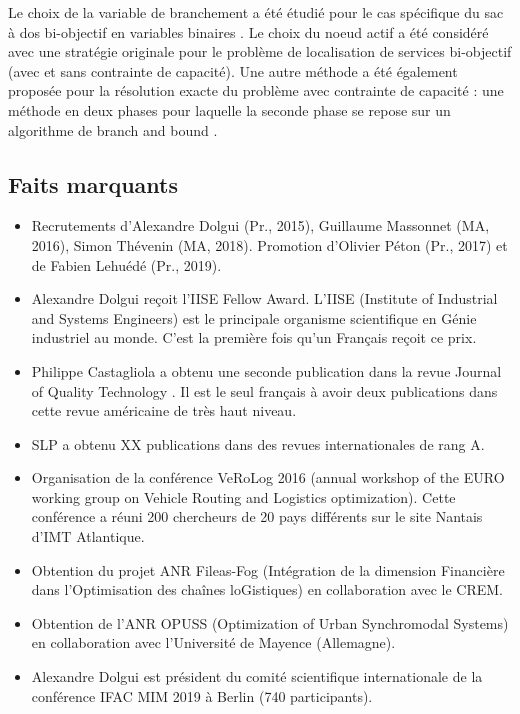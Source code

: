 \begin{enumerate}
Le choix de la variable de branchement a été étudié pour le cas spécifique du sac à dos bi-objectif en variables binaires \cite{cerqueus:hal-01564982}. Le choix du noeud actif a été considéré avec une stratégie originale pour le problème de localisation de services bi-objectif \cite{delmee:hal-01435524} (avec et sans contrainte de capacité). Une autre méthode a  été également proposée pour la résolution exacte du problème avec contrainte de capacité : une méthode en deux phases pour laquelle la seconde phase se repose sur un algorithme de branch and bound \cite{delmee:hal-02480176}. 

\end{enumerate}

  		
\subsection{Faits marquants}



\begin{itemize}
    \item Recrutements d'Alexandre Dolgui (Pr., 2015), Guillaume  Massonnet (MA, 2016), Simon  Thévenin (MA, 2018). Promotion  d'Olivier Péton (Pr., 2017) et de Fabien Lehuédé (Pr., 2019).
    \item Alexandre Dolgui reçoit l'IISE Fellow Award. L'IISE (Institute of Industrial and Systems Engineers) est le principale organisme scientifique en Génie industriel au monde. C'est la première fois qu'un Français reçoit ce prix.
    \item Philippe Castagliola a obtenu une seconde publication dans la revue Journal of Quality Technology \cite{castagliola:hal-02002980}. Il est le seul français à avoir deux publications dans cette revue américaine de très haut niveau.
    \item SLP a obtenu XX publications  dans des revues internationales de rang A.
    \item Organisation de la conférence VeRoLog 2016 (annual workshop of the EURO working group on Vehicle Routing and Logistics optimization). Cette conférence a réuni 200 chercheurs de 20 pays différents sur le site Nantais d'IMT Atlantique. 
    \item Obtention du projet ANR Fileas-Fog (Intégration de la dimension Financière dans l’Optimisation des chaînes loGistiques) en collaboration avec le CREM.
    \item Obtention de l'ANR OPUSS (Optimization of Urban Synchromodal Systems) en collaboration avec l'Université de Mayence (Allemagne).
    \item Alexandre Dolgui est président du comité scientifique internationale de la conférence IFAC MIM 2019 à Berlin (740 participants). 
\end{itemize}


